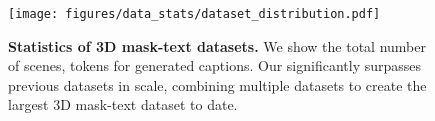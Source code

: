 \begin{figure}[t]
    \centering
    \texttt{[image: figures/data\_stats/dataset\_distribution.pdf]}
    \vspace{-5mm}
    \caption{\textbf{Statistics of 3D mask-text datasets.} We show the total number of scenes, tokens for generated captions. Our \dataname significantly surpasses previous datasets in scale, combining multiple datasets to create the largest 3D mask-text dataset to date.}
    \label{fig:data_stats}
\end{figure}
